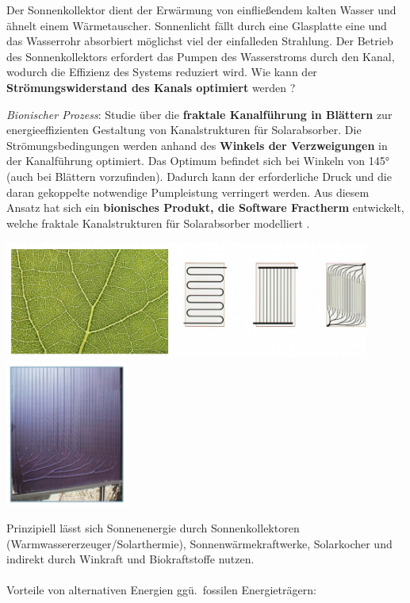 Der Sonnenkollektor dient der Erwärmung von einfließendem kalten Wasser und ähnelt einem Wärmetauscher. Sonnenlicht fällt durch eine Glasplatte eine und das Wasserrohr absorbiert möglichst viel der einfalleden Strahlung. Der Betrieb des Sonnenkollektors erfordert das Pumpen des Wasserstroms durch den Kanal, wodurch die Effizienz des Systems reduziert wird. Wie kann der \textbf{Strömungswiderstand des Kanals optimiert} werden \dangersign?

\textit{Bionischer Prozess}: Studie über die \textbf{fraktale Kanalführung in Blättern} zur energieeffizienten Gestaltung von Kanalstrukturen für Solarabsorber. Die Strömungsbedingungen werden anhand des \textbf{Winkels der Verzweigungen} in der Kanalführung optimiert. Das Optimum befindet sich bei Winkeln von 145° (auch bei Blättern vorzufinden). Dadurch kann der erforderliche Druck und die daran gekoppelte notwendige Pumpleistung verringert werden. Aus diesem Ansatz hat sich ein \textbf{bionisches Produkt, die Software Fractherm} entwickelt, welche fraktale Kanalstrukturen für Solarabsorber modelliert \dangersign.

\begin{center}
    \includegraphics[width=12cm]{lec7/figures/kanal.png}
    \hfill
    \includegraphics[width=4cm]{lec7/figures/fraktal.png}
\end{center}
Prinzipiell lässt sich Sonnenenergie durch Sonnenkollektoren (Warmwassererzeuger/Solarthermie), Sonnenwärmekraftwerke, Solarkocher und indirekt durch Winkraft und Biokraftstoffe nutzen.
\\\\
Vorteile von alternativen Energien ggü.\ fossilen Energieträgern:

